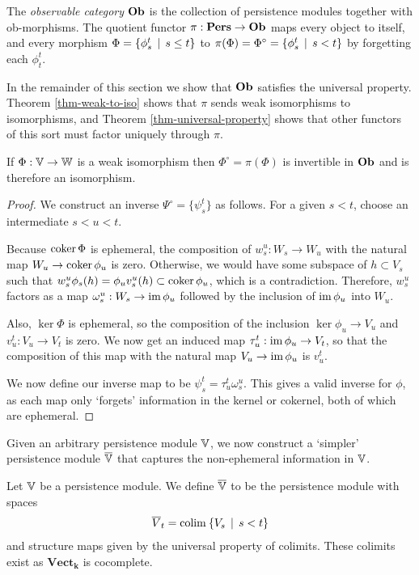 \begin{definition}
The \emph{observable category} $\mathbf{Ob}$ is the collection of persistence modules together with ob-morphisms. The quotient functor $\pi : \mathbf{Pers} \to \mathbf{Ob}$ maps every object to itself, and every morphism $\Phi = \{ \phi_s^t \, \mid \, s \leq t \}$ to $\pi(\Phi) = \Phi^\circ = \{ \phi_s^t \, \mid \, s < t \}$ by forgetting each $\phi_t^t$.
\end{definition}

In the remainder of this section we show that $\mathbf{Ob}$ satisfies the universal property. Theorem \ref{thm-weak-to-iso} shows that $\pi$ sends weak isomorphisms to isomorphisms, and Theorem \ref{thm-universal-property} shows that other functors of this sort must factor uniquely through $\pi$.

\begin{theorem}
\label{thm-weak-to-iso}
If $\Phi : \mathbb{V} \to \mathbb{W}$ is a weak isomorphism then $\Phi^\circ = \pi(\Phi)$ is invertible in $\mathbf{Ob}$ and is therefore an isomorphism.
\end{theorem}
\begin{proof}
We construct an inverse $\Psi^\circ = \{\psi_s^t\}$ as follows. For a given $s < t$, choose an intermediate $s < u < t$. 

Because $\operatorname{coker} \Phi$ is ephemeral, the composition of $w_s^u : W_s \to W_u$ with the natural map $W_u \to \operatorname{coker} \phi_u$ is zero. Otherwise, we would have some subspace of $h \subset V_s$ such that $w_s^u \phi_s(h) = \phi_u v_s^u(h) \subset \operatorname{coker} \phi_u$, which is a contradiction. Therefore, $w_s^u$ factors as a map $\omega_s^u : W_s \to \operatorname{im} \phi_u$ followed by the inclusion of $\operatorname{im} \phi_u$ into $W_u$.

Also, $\ker \Phi$ is ephemeral, so the composition of the inclusion $\ker \phi_u \to V_u$ and $v_u^t : V_u \to V_t$ is zero. We now get an induced map $\tau_u^t : \operatorname{im} \phi_u \to V_t$, so that the composition of this map with the natural map $V_u \to \operatorname{im} \phi_u$ is $v_u^t$.

We now define our inverse map to be $\psi_s^t = \tau_u^t \omega_s^u$. This gives a valid inverse for $\phi$, as each map only `forgets' information in the kernel or cokernel, both of which are ephemeral.
\end{proof}

Given an arbitrary persistence module $\mathbb{V}$, we now construct a `simpler' persistence module $\overline{\mathbb{V}}$ that captures the non-ephemeral information in $\mathbb{V}$.

\begin{definition}
Let $\mathbb{V}$ be a persistence module. We define $\overline{\mathbb{V}}$ to be the persistence module with spaces
\begin{align*}
\overline V_t = \operatorname{colim} \: \{V_s \, \mid \, s < t\}
\end{align*}
and structure maps given by the universal property of colimits. These colimits exist as $\mathbf{Vect}_\mathbf{k}$ is cocomplete.
\end{definition}

